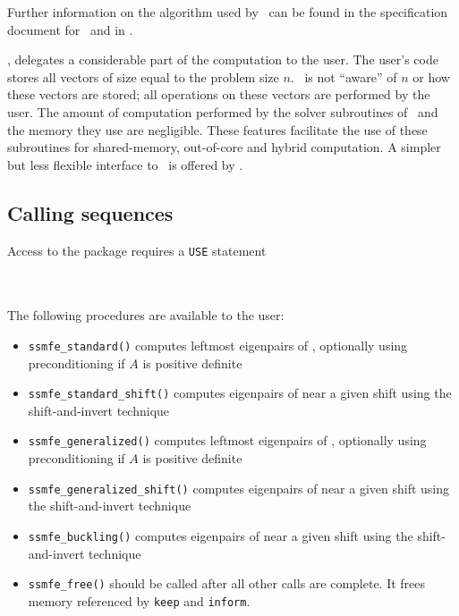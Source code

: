 Further information on the algorithm used by
\fullpackagename\ can be found in the
specification document for \engine\
and in \report.

\fullpackagename,
delegates 
a considerable part of the computation to the user.
The user's code stores all  vectors  of size equal to the problem size $n$.
\fullpackagename\
is not ``aware'' of $n$ or how these vectors are stored; 
all operations on these vectors are performed by the user.
The amount of computation performed by 
the solver subroutines of \fullpackagename\
and the memory they use are negligible. 
These features facilitate the use of these subroutines
for shared-memory, out-of-core and hybrid computation.
A simpler but less flexible interface to
\fullpackagename\
is offered by \simple.

\subsection{Calling sequences}

\label{sec:call}

Access to the package requires a {\tt USE} statement \\ \\
\indent\hspace{8mm}{\tt use \fullpackagename} \\

\medskip

\noindent The following procedures are available to the user:
%
\begin{itemize}
\vspace{-0.1cm}
\item {\tt ssmfe\_standard()} 
computes leftmost eigenpairs of , 
optionally using preconditioning if $A$ is positive definite
\item {\tt ssmfe\_standard\_shift()} 
computes eigenpairs of  near a given shift
using the shift-and-invert technique
\item {\tt ssmfe\_generalized()} 
computes leftmost eigenpairs of 
, optionally using preconditioning if $A$ is positive definite
\item {\tt ssmfe\_generalized\_shift()} 
computes eigenpairs of 
\Ref{evp.g} near a given shift
using the shift-and-invert technique
\item {\tt ssmfe\_buckling()} 
computes eigenpairs of 
\Ref{evp.b} near a given shift
using the shift-and-invert technique
\item {\tt ssmfe\_free()}  should be called after all other calls
are complete. It frees memory referenced by \texttt{keep} and \texttt{inform}.
%
\end{itemize}

